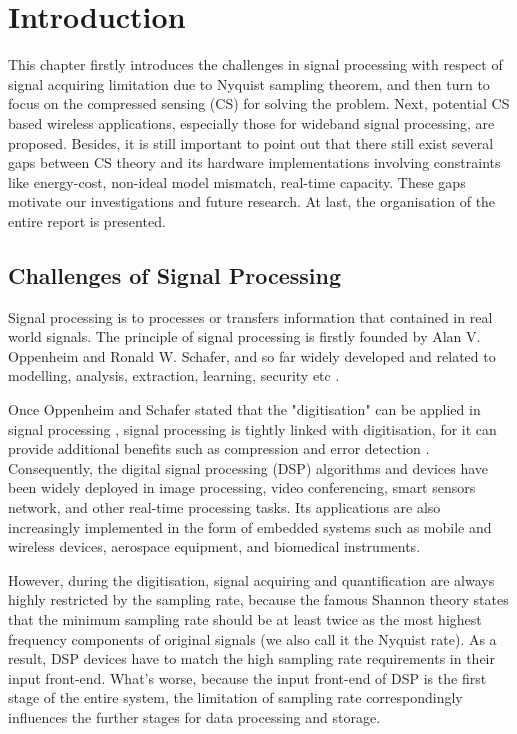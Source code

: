 \chapter{Introduction}\label{C:Introduction}

\indent \indent This chapter firstly introduces the challenges in signal processing with respect of signal acquiring limitation due to Nyquist sampling theorem, and then turn to focus on the compressed sensing (CS) for solving the problem. Next, potential CS based wireless applications, especially those for wideband signal processing, are proposed. Besides, it is still important to point out that there still exist several gaps between CS theory and its hardware implementations involving constraints like energy-cost, non-ideal model mismatch, real-time capacity. These gaps motivate our investigations and future research. At last, the organisation of the entire report is presented.

\section{Challenges of Signal Processing}
\indent \indent Signal processing is to processes or transfers information that contained in real world signals. The principle of signal processing is firstly founded by Alan V. Oppenheim and Ronald W. Schafer, and so far widely developed and related to modelling, analysis, extraction, learning, security etc \cite{moura2009signal}. 

Once Oppenheim and Schafer stated that the "digitisation" can be applied in signal processing \cite{oppenheim1989discrete}, signal processing is tightly linked with digitisation, for it can provide additional benefits such as compression and error detection \cite{broesch2008digital}. Consequently, the digital signal processing (DSP) algorithms and devices have been widely deployed in image processing, video conferencing, smart sensors network, and other real-time processing tasks. Its applications are also increasingly implemented in the form of embedded systems such as mobile and wireless devices\cite{mamaghanian2011compressed}, aerospace equipment, and biomedical instruments\cite{lustig2008compressed}.

However, during the digitisation, signal acquiring and quantification are always highly restricted by the sampling rate, because the famous Shannon theory states that the minimum sampling rate should be at least twice as the most highest frequency components of original signals (we also call it the Nyquist rate). As a result, DSP devices have to match the high sampling rate requirements in their input front-end. What's worse, because the input front-end of DSP is the first stage of the entire system, the limitation of sampling rate correspondingly influences the further stages for data processing and storage.

